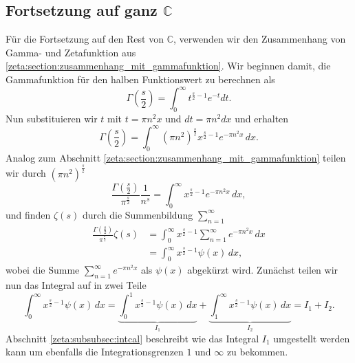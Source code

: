 \subsection{Fortsetzung auf ganz $\mathbb{C}$} \label{zeta:subsection:auf_ganz}
Für die Fortsetzung auf den Rest von $\mathbb{C}$, verwenden wir den Zusammenhang von Gamma- und Zetafunktion aus \ref{zeta:section:zusammenhang_mit_gammafunktion}.
Wir beginnen damit, die Gammafunktion für den halben Funktionswert zu berechnen als
\begin{equation}
    \Gamma \left( \frac{s}{2} \right)
    =
    \int_0^{\infty} t^{\frac{s}{2}-1} e^{-t} dt.
\end{equation}
Nun substituieren wir $t$ mit $t = \pi n^2 x$ und $dt=\pi n^2 dx$ und erhalten
\begin{equation}
    \Gamma \left( \frac{s}{2} \right)
    =
    \int_0^{\infty}
    (\pi n^2)^{\frac{s}{2}}
    x^{\frac{s}{2}-1}
    e^{-\pi n^2 x}
    \,dx.
\end{equation}
Analog zum Abschnitt \ref{zeta:section:zusammenhang_mit_gammafunktion} teilen wir durch $(\pi n^2)^{\frac{s}{2}}$
\begin{equation}
    \frac{\Gamma \left( \frac{s}{2} \right)}{\pi^{\frac{s}{2}}}
    \frac{1}{n^s}
     =
    \int_0^{\infty}
    x^{\frac{s}{2}-1}
    e^{-\pi n^2 x}
    \,dx,
\end{equation}
und finden $\zeta(s)$ durch die Summenbildung $\sum_{n=1}^{\infty}$
\begin{align}
    \frac{\Gamma \left( \frac{s}{2} \right)}{\pi^{\frac{s}{2}}}
    \zeta(s)
    &=
    \int_0^{\infty}
    x^{\frac{s}{2}-1}
    \sum_{n=1}^{\infty}
    e^{-\pi n^2 x}
    \,dx\label{zeta:equation:integral1}
    \\
    &=
    \int_0^{\infty}
    x^{\frac{s}{2}-1}
    \psi(x)
    \,dx,
\end{align}
wobei die Summe $\sum_{n=1}^{\infty} e^{-\pi n^2 x}$ als $\psi(x)$ abgekürzt wird.
Zunächst teilen wir nun das Integral auf in zwei Teile
\begin{equation}\label{zeta:equation:integral2}
    \int_0^{\infty}
    x^{\frac{s}{2}-1}
    \psi(x)
    \,dx
    =
    \underbrace{
    \int_0^{1}
    x^{\frac{s}{2}-1}
    \psi(x)
    \,dx
    }_{I_1}
    +
    \underbrace{
    \int_1^{\infty}
    x^{\frac{s}{2}-1}
    \psi(x)
    \,dx
    }_{I_2}
    =
    I_1 + I_2.
\end{equation}
Abschnitt \ref{zeta:subsubsec:intcal} beschreibt wie das Integral $I_1$ umgestellt werden kann um ebenfalls die Integrationsgrenzen $1$ und $\infty$ zu bekommen.
